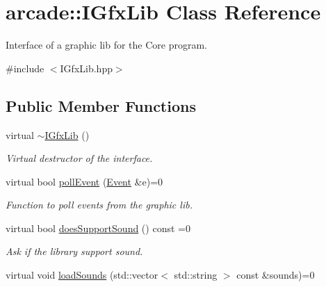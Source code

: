 \hypertarget{classarcade_1_1IGfxLib}{}\section{arcade\+:\+:I\+Gfx\+Lib Class Reference}
\label{classarcade_1_1IGfxLib}


Interface of a graphic lib for the Core program.  




{\ttfamily \#include $<$I\+Gfx\+Lib.\+hpp$>$}

\subsection*{Public Member Functions}
\begin{DoxyCompactItemize}
\item 
\mbox{\label{classarcade_1_1IGfxLib_a1dc0971c862d69be60af1d3b82960c77}} 
virtual \hyperlink{classarcade_1_1IGfxLib_a1dc0971c862d69be60af1d3b82960c77}{$\sim$\+I\+Gfx\+Lib} ()
\begin{DoxyCompactList}\small\item\em Virtual destructor of the interface. \end{DoxyCompactList}\item 
virtual bool \hyperlink{classarcade_1_1IGfxLib_a82cdd82f168ca898ef81edf82ca6147a}{poll\+Event} (\hyperlink{structarcade_1_1Event}{Event} \&e)=0
\begin{DoxyCompactList}\small\item\em Function to poll events from the graphic lib. \end{DoxyCompactList}\item 
\mbox{\label{classarcade_1_1IGfxLib_a68cfbc987dfecca5b1405e36e00157b2}} 
virtual bool \hyperlink{classarcade_1_1IGfxLib_a68cfbc987dfecca5b1405e36e00157b2}{does\+Support\+Sound} () const =0
\begin{DoxyCompactList}\small\item\em Ask if the library support sound. \end{DoxyCompactList}\item 
\mbox{\label{classarcade_1_1IGfxLib_aa5a0867d08be135250a8bf12782bc14f}} 
virtual void \hyperlink{classarcade_1_1IGfxLib_aa5a0867d08be135250a8bf12782bc14f}{load\+Sounds} (std\+::vector$<$ std\+::string $>$ const \&sounds)=0

\end{DoxyCompactItemize}
